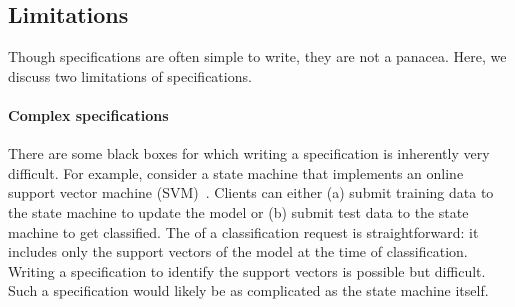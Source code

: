 \subsection{Limitations}
Though \watprovenance{} specifications are often simple to write, they are not
a panacea. Here, we discuss two limitations of \watprovenance{} specifications.

\paragraph{Complex \watprovenance{} specifications}
There are some black boxes for which writing a \watprovenance{} specification
is inherently very difficult. For example, consider a state machine that
implements an online support vector machine (SVM)~\cite{hearst1998support,
laskov2006incremental, bordes12huller}. Clients can either (a) submit training
data to the state machine to update the model or (b) submit test data to the
state machine to get classified. The \watprovenance{} of a classification
request is straightforward: it includes only the support vectors of the model
at the time of classification. Writing a \watprovenance{} specification to
identify the support vectors is possible but difficult. Such a \watprovenance{}
specification would likely be as complicated as the state machine itself.



